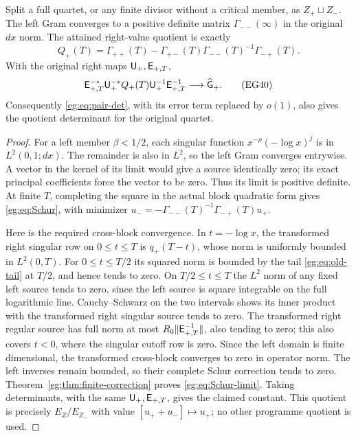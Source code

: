 \begin{egproposition}\label{eg:prop:left-minimum}
Split a full quartet, or any finite divisor without a critical member,
as $Z_+\sqcup Z_-$. The left Gram converges to a positive definite
matrix $\Gamma_{--}(\infty)$ in the original $dx$ norm. The attained
right-value quotient is exactly
\[
 Q_+(T)=\Gamma_{++}(T)-\Gamma_{+-}(T)
                     \Gamma_{--}(T)^{-1}\Gamma_{-+}(T).
 \tag{EG39}\label{eg:eq:Schur}
\]
With the original right maps $\mathsf U_+,\mathsf E_{+,T}$,
\[
 \mathsf E_{+,T}^{-*}\mathsf U_+^{-*}Q_+(T)\mathsf U_+^{-1}\mathsf E_{+,T}^{-1}
                             \longrightarrow\widehat{\mathsf G}_+.
 \tag{EG40}\label{eg:eq:Schur-limit}
\]
Consequently \eqref{eg:eq:pair-det}, with its error term replaced by
$o(1)$, also gives the quotient determinant for the original quartet.
\end{egproposition}
\begin{proof}
For a left member $\beta<1/2$, each singular function
$x^{-\rho}(-\log x)^j$ is in $L^2(0,1;dx)$. The remainder is also
in $L^2$, so the left Gram converges entrywise. A vector in the
kernel of its limit would give a source identically zero; its exact
principal coefficients force the vector to be zero. Thus its limit
is positive definite. At finite $T$, completing the square in the
actual block quadratic form gives \eqref{eg:eq:Schur}, with minimizer
$u_-=-\Gamma_{--}(T)^{-1}\Gamma_{-+}(T)u_+$.

Here is the required cross-block convergence. In $t=-\log x$,
the transformed right singular row on $0\le t\le T$ is
$q_+(T-t)$, whose norm is uniformly bounded in $L^2(0,T)$.
For $0\le t\le T/2$ its squared norm is bounded by the tail
\eqref{eg:eq:old-tail} at $T/2$, and hence tends to zero. On
$T/2\le t\le T$ the $L^2$ norm of any fixed left source tends
to zero, since the left source is square integrable on the full
logarithmic line. Cauchy--Schwarz on the two intervals shows its
inner product with the transformed right singular source tends
to zero. The transformed right regular source has full norm at
most $R_0\|\mathsf E_{+,T}^{-1}\|$, also tending to zero; this also
covers $t<0$, where the singular cutoff row is zero. Since the
left domain is finite dimensional, the transformed cross-block
converges to zero in operator norm. The left inverses remain
bounded, so their complete Schur correction tends to zero.
Theorem~\ref{eg:thm:finite-correction} proves \eqref{eg:eq:Schur-limit}.
Taking determinants, with the same $\mathsf U_+,\mathsf E_{+,T}$, gives the
claimed constant. This quotient is precisely $E_Z/E_{Z_-}$ with
value $[u_++u_-]\mapsto u_+$; no other programme quotient is used.
\end{proof}

